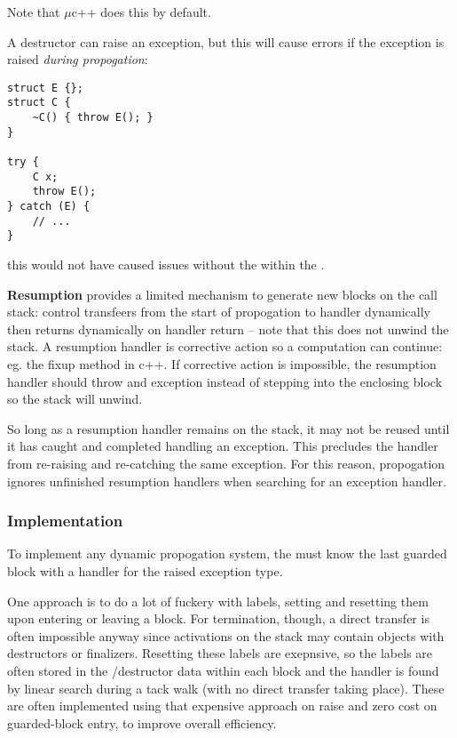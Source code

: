 \documentclass[12pt]{article}
\begin{document}
Note that $\mu$c++ does this by default.

A destructor can raise an exception, but this will cause errors if the exception is raised \textit{during propogation}:
\begin{verbatim}
struct E {};
struct C {
    ~C() { throw E(); }
}

try {
    C x;
    throw E();
} catch (E) {
    // ...
}
\end{verbatim}
this would not have caused issues without the  within the .

{\bf Resumption} provides a limited mechanism to generate new blocks on the call stack: control transfeers from the start of propogation to handler dynamically then returns dynamically on handler return -- note that this does not unwind the stack. A resumption handler is corrective action so a computation can continue: eg. the  fixup method in c++. If corrective action is impossible, the resumption handler should throw and exception instead of stepping into the enclosing block so the stack will unwind.

So long as a resumption handler remains on the stack, it may not be reused until it has caught and completed handling an exception. This precludes the handler from re-raising and re-catching the same exception. For this reason, propogation ignores unfinished resumption handlers when searching for an exception handler.

\subsubsection{Implementation}
To implement any dynamic propogation system, the  must know the last guarded block with a handler for the raised exception type.

One approach is to do a lot of fuckery with labels, setting and resetting them upon entering or leaving a block. For termination, though, a direct transfer is often impossible anyway since activations on the stack may contain objects with destructors or finalizers. Resetting these labels are exepnsive, so the labels are often stored in the /destructor data within each block and the handler is found by linear search during a tack walk (with no direct transfer taking place). These are often implemented using that expensive approach on raise and zero cost on guarded-block entry, to improve overall efficiency.

\end{document}
